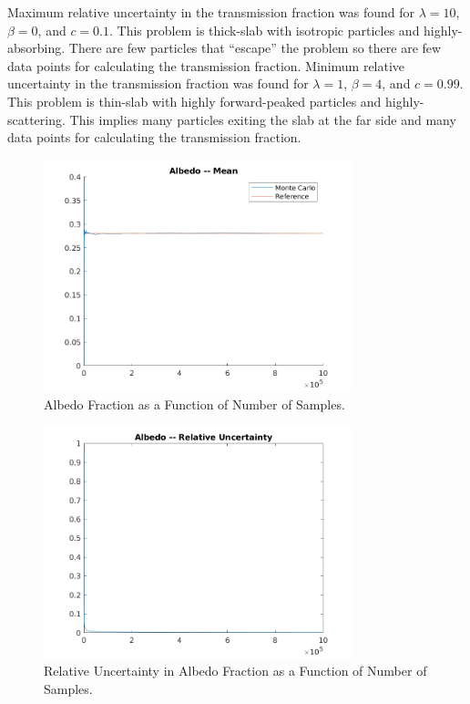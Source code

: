 \documentclass{article}
\begin{document}
  Maximum relative uncertainty in the transmission fraction was found for
  $\lambda = 10$, $\beta = 0$, and $c = 0.1$. This problem is thick-slab with
  isotropic particles and highly-absorbing. There are few particles that
  ``escape'' the problem so there are few data points for calculating the
  transmission fraction. Minimum relative uncertainty in the transmission
  fraction was found for $\lambda = 1$, $\beta = 4$, and $c = 0.99$. This
  problem is thin-slab with highly forward-peaked particles and
  highly-scattering. This implies many particles exiting the slab at the far
  side and many data points for calculating the transmission fraction.

  \begin{figure}
    \centering
    \includegraphics[width=0.8\textwidth]{albedo_mean}
    \caption{Albedo Fraction as a Function of Number of Samples.}
    \label{fig:albedo_mean}
  \end{figure}
  \begin{figure}
    \centering
    \includegraphics[width=0.8\textwidth]{albedo_reluncertainty}
    \caption{Relative Uncertainty in Albedo Fraction as a Function of Number 
      of Samples.}
    \label{fig:albedo_reluncertainty}
  \end{figure}
\end{document}
